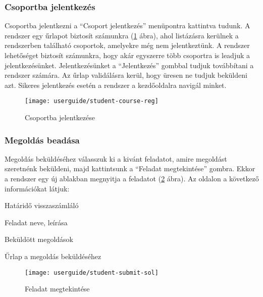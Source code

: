 \subsubsection{Csoportba jelentkezés}
\label{step:student-course-reg}
Csoportba jelentkezni a ``Csoport jelentkezés'' menüpontra kattintva tudunk. A rendszer egy űrlapot biztosít számunkra (\ref{fig:student-course-reg} ábra), ahol listázásra kerülnek a rendszerben található csoportok, amelyekre még nem jelentkeztünk. A rendszer lehetőséget biztosít számunkra, hogy akár egyszerre több csoportra is leadjuk a jelentkezésünket. Jelentkezésünket a ``Jelentkezés'' gombbal tudjuk továbbítani a rendszer számára. Az űrlap validálásra kerül, hogy üresen ne tudjuk beküldeni azt. Sikeres jelentkezés esetén a rendszer a kezdőoldalra navigál minket.
\begin{figure}[H]
	\centering
	\texttt{[image: userguide/student-course-reg]}
	\caption{Csoportba jelentkezése}
	\label{fig:student-course-reg}
\end{figure}
\subsubsection{Megoldás beadása}
\label{step:student-solution}
Megoldás beküldéséhez válasszuk ki a kivánt feladatot, amire megoldást szeretnénk beküldeni, majd kattintsunk a ``Feladat megtekintése'' gombra. Ekkor a rendszer egy új ablakban megnyitja a feladatot (\ref{fig:student-submit-sol} ábra). Az oldalon a következő információkat látjuk:
\begin{compactitem}
    \item Határidő visszaszámláló
    \item Feladat neve, leírása
    \item Beküldött megoldások
    \item Űrlap a megoldás beküldéséhez
\end{compactitem}
\begin{figure}[H]
	\centering
	\texttt{[image: userguide/student-submit-sol]}
	\caption{Feladat megtekintése}
	\label{fig:student-submit-sol}
\end{figure}
